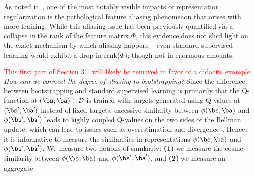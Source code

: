 As noted in~\citep{kumar2021implicit}, one of the most notably visible impacts of representation regularization is the pathological feature aliasing phenomenon that arises with more training. While this aliasing issue has been previously quantified via a collapse in the rank of the feature matrix $\Phi$, this evidence does not shed light on the exact mechanism by which aliasing happens -- even standard supervised learning would exhibit a drop in rank($\Phi$); though not in enormous amounts. %

\textcolor{red}{This first part of Section 3.1 will likely be removed in favor of a didactic example} \textit{How can we connect the degree of aliasing to bootstrapping?} Since the difference between bootstrapping and standard supervised learning is primarily that the Q-function at $(\bs, \ba) \in \mathcal{D}$ is trained  with targets generated using Q-values at $(\bs', \ba')$ instead of fixed targets, excessive similarity between $\phi(\bs, \ba)$ and $\phi(\bs', \ba')$ leads to highly coupled Q-values on the two sides of the Bellman update, which can lead to issues such as overestimation and divergence~\citep{durugkar2018td}. Hence, it is informative to measure the similarities in representations $\phi(\bs, \ba)$ and $\phi(\bs', \ba')$. We measure two notions of similarity: \textbf{(1)} we measure the cosine similarity between $\phi(\bs, \ba)$ and $\phi(\bs', \ba')$, and \textbf{(2)} we measure an aggregate    

